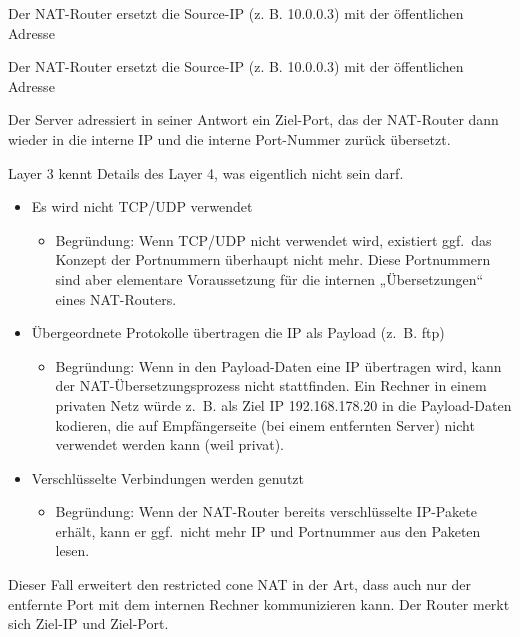 Der NAT-Router ersetzt die Source-IP (z. B. 10.0.0.3) mit der öffentlichen Adresse

Der NAT-Router ersetzt die Source-IP (z. B. 10.0.0.3) mit der öffentlichen Adresse

Der Server adressiert in seiner Antwort ein Ziel-Port, das der NAT-Router dann wieder in die interne IP und die interne Port-Nummer zurück übersetzt.

Layer 3 kennt Details des Layer 4, was eigentlich nicht sein darf.

\begin{itemize}
    \item Es wird nicht TCP/UDP verwendet
    \begin{itemize}
        \item Begründung: Wenn TCP/UDP nicht verwendet wird, existiert ggf.\ das Konzept der Portnummern überhaupt nicht mehr.
        Diese Portnummern sind aber elementare Voraussetzung für die internen „Übersetzungen“ eines NAT-Routers.
    \end{itemize}
    \item Übergeordnete Protokolle übertragen die IP als Payload (z.\ B. ftp)
    \begin{itemize}
        \item Begründung: Wenn in den Payload-Daten eine IP übertragen wird, kann der NAT-Übersetzungsprozess nicht stattfinden.
        Ein Rechner in einem privaten Netz würde z.\ B. als Ziel IP 192.168.178.20 in die Payload-Daten kodieren, die auf Empfängerseite (bei einem entfernten Server) nicht verwendet werden kann (weil privat).
    \end{itemize}
    \item Verschlüsselte Verbindungen werden genutzt
    \begin{itemize}
        \item Begründung: Wenn der NAT-Router bereits verschlüsselte IP-Pakete erhält, kann er ggf.\ nicht mehr IP und Portnummer aus den Paketen lesen.
    \end{itemize}
\end{itemize}

Dieser Fall erweitert den restricted cone NAT in der Art, dass auch nur der entfernte Port mit dem internen Rechner kommunizieren kann.
Der Router merkt sich Ziel-IP und Ziel-Port.